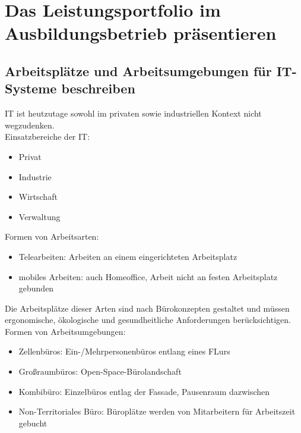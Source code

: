 \section{Das Leistungsportfolio im Ausbildungsbetrieb präsentieren}
\subsection{Arbeitsplätze und Arbeitsumgebungen für IT-Systeme beschreiben}
    \begin{subindent}
        IT ist heutzutage sowohl im privaten sowie industriellen Kontext nicht wegzudenken. \\
        Einsatzbereiche der IT\@:
    \end{subindent}
    
    \begin{itemize}[leftmargin=2.5cm, topsep=0.3em, itemsep=0.1em, parsep=0.5em]
        \item Privat
        \item Industrie
        \item Wirtschaft
        \item Verwaltung
    \end{itemize}
    
    \begin{subindent}
        Formen von Arbeitsarten:
    \end{subindent}
    
    \begin{itemize}[leftmargin=2.5cm, topsep=0.3em, itemsep=0.1em, parsep=0.5em]
        \item Telearbeiten: Arbeiten an einem eingerichteten Arbeitsplatz
        \item mobiles Arbeiten: auch Homeoffice, Arbeit nicht an festen Arbeitsplatz gebunden
    \end{itemize}
    
    \begin{subindent}
        Die Arbeitsplätze dieser Arten sind nach Bürokonzepten gestaltet und müssen ergonomische, ökologische und gesundheitliche Anforderungen berücksichtigen. \\
        Formen von Arbeitsumgebungen:
    \end{subindent}
    
    \begin{itemize}[leftmargin=2.5cm, topsep=0.3em, itemsep=0.1em, parsep=0.5em]
        \item Zellenbüros: Ein-/Mehrpersonenbüros entlang eines FLurs
        \item Großraumbüros: Open-Space-Bürolandschaft
        \item Kombibüro: Einzelbüros entlag der Fassade, Pausenraum dazwischen
        \item Non-Territoriales Büro: Büroplätze werden von Mitarbeitern für Arbeitszeit gebucht
    \end{itemize}
    
